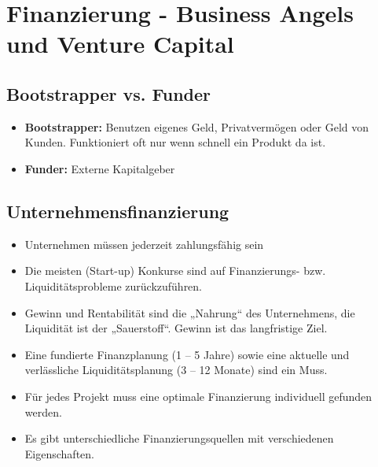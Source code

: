 \section{Finanzierung - Business Angels und Venture Capital}
\subsection{Bootstrapper vs. Funder}
\begin{itemize}
	\item \textbf{Bootstrapper:} Benutzen eigenes Geld, Privatvermögen oder Geld von Kunden. Funktioniert oft nur wenn schnell ein Produkt da ist.
	\item \textbf{Funder:} Externe Kapitalgeber
\end{itemize}

\subsection{Unternehmensfinanzierung}
\begin{itemize}
	\item Unternehmen müssen jederzeit zahlungsfähig sein
	\item Die meisten (Start-up) Konkurse sind auf Finanzierungs- bzw. Liquiditätsprobleme zurückzuführen.
	\item Gewinn und Rentabilität sind die „Nahrung“ des Unternehmens, die Liquidität ist der „Sauerstoff“. Gewinn ist das langfristige Ziel.
	\item Eine fundierte Finanzplanung (1 – 5 Jahre) sowie eine aktuelle und verlässliche Liquiditätsplanung (3 – 12 Monate) sind ein Muss.
	\item Für jedes Projekt muss eine optimale Finanzierung individuell gefunden werden.
	\item Es gibt unterschiedliche Finanzierungsquellen mit verschiedenen Eigenschaften.
\end{itemize}

